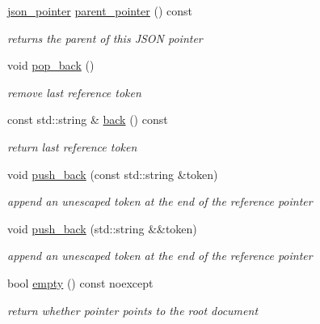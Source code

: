\begin{DoxyCompactItemize}
\hyperlink{classnlohmann_1_1json__pointer}{json\+\_\+pointer} \hyperlink{classnlohmann_1_1json__pointer_afdaacce1edb7145e0434e014f0e8685a}{parent\+\_\+pointer} () const
\begin{DoxyCompactList}\small\item\em returns the parent of this J\+S\+ON pointer \end{DoxyCompactList}\item 
void \hyperlink{classnlohmann_1_1json__pointer_a4b1ee4d511ca195bed896a3da47e264c}{pop\+\_\+back} ()
\begin{DoxyCompactList}\small\item\em remove last reference token \end{DoxyCompactList}\item 
const std\+::string \& \hyperlink{classnlohmann_1_1json__pointer_a213bc67c32a30c68ac6bf06f5195d482}{back} () const
\begin{DoxyCompactList}\small\item\em return last reference token \end{DoxyCompactList}\item 
void \hyperlink{classnlohmann_1_1json__pointer_a697d12b5bd6205f8866691b166b7c7dc}{push\+\_\+back} (const std\+::string \&token)
\begin{DoxyCompactList}\small\item\em append an unescaped token at the end of the reference pointer \end{DoxyCompactList}\item 
void \hyperlink{classnlohmann_1_1json__pointer_ac228b13596d3c34185da9fe61b570194}{push\+\_\+back} (std\+::string \&\&token)
\begin{DoxyCompactList}\small\item\em append an unescaped token at the end of the reference pointer \end{DoxyCompactList}\item 
bool \hyperlink{classnlohmann_1_1json__pointer_a649252bda4a2e75a0915b11a25d8bcc3}{empty} () const noexcept
\begin{DoxyCompactList}\small\item\em return whether pointer points to the root document \end{DoxyCompactList}\end{DoxyCompactItemize}
